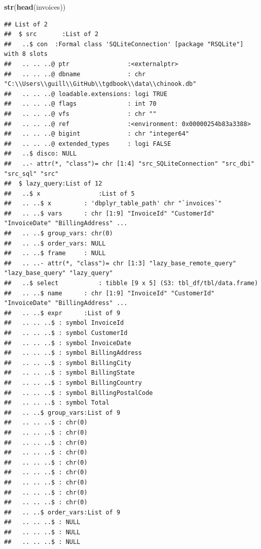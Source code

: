 \documentclass[
]{book}
\newenvironment{Shaded}{\begin{snugshade}}{\end{snugshade}}
\newcommand{\FunctionTok}[1]{\textcolor[rgb]{0.13,0.29,0.53}{\textbf{#1}}}
\newcommand{\NormalTok}[1]{#1}
\begin{document}
\begin{Shaded}
\begin{Highlighting}[]
\FunctionTok{str}\NormalTok{(}\FunctionTok{head}\NormalTok{(invoices))}
\end{Highlighting}
\end{Shaded}

\begin{verbatim}
## List of 2
##  $ src       :List of 2
##   ..$ con  :Formal class 'SQLiteConnection' [package "RSQLite"] with 8 slots
##   .. .. ..@ ptr                :<externalptr> 
##   .. .. ..@ dbname             : chr "C:\\Users\\guill\\GitHub\\tgdbook\\data\\chinook.db"
##   .. .. ..@ loadable.extensions: logi TRUE
##   .. .. ..@ flags              : int 70
##   .. .. ..@ vfs                : chr ""
##   .. .. ..@ ref                :<environment: 0x00000254b83a3388> 
##   .. .. ..@ bigint             : chr "integer64"
##   .. .. ..@ extended_types     : logi FALSE
##   ..$ disco: NULL
##   ..- attr(*, "class")= chr [1:4] "src_SQLiteConnection" "src_dbi" "src_sql" "src"
##  $ lazy_query:List of 12
##   ..$ x                :List of 5
##   .. ..$ x         : 'dbplyr_table_path' chr "`invoices`"
##   .. ..$ vars      : chr [1:9] "InvoiceId" "CustomerId" "InvoiceDate" "BillingAddress" ...
##   .. ..$ group_vars: chr(0) 
##   .. ..$ order_vars: NULL
##   .. ..$ frame     : NULL
##   .. ..- attr(*, "class")= chr [1:3] "lazy_base_remote_query" "lazy_base_query" "lazy_query"
##   ..$ select           : tibble [9 x 5] (S3: tbl_df/tbl/data.frame)
##   .. ..$ name      : chr [1:9] "InvoiceId" "CustomerId" "InvoiceDate" "BillingAddress" ...
##   .. ..$ expr      :List of 9
##   .. .. ..$ : symbol InvoiceId
##   .. .. ..$ : symbol CustomerId
##   .. .. ..$ : symbol InvoiceDate
##   .. .. ..$ : symbol BillingAddress
##   .. .. ..$ : symbol BillingCity
##   .. .. ..$ : symbol BillingState
##   .. .. ..$ : symbol BillingCountry
##   .. .. ..$ : symbol BillingPostalCode
##   .. .. ..$ : symbol Total
##   .. ..$ group_vars:List of 9
##   .. .. ..$ : chr(0) 
##   .. .. ..$ : chr(0) 
##   .. .. ..$ : chr(0) 
##   .. .. ..$ : chr(0) 
##   .. .. ..$ : chr(0) 
##   .. .. ..$ : chr(0) 
##   .. .. ..$ : chr(0) 
##   .. .. ..$ : chr(0) 
##   .. .. ..$ : chr(0) 
##   .. ..$ order_vars:List of 9
##   .. .. ..$ : NULL
##   .. .. ..$ : NULL
##   .. .. ..$ : NULL

\end{verbatim}
\end{document}
